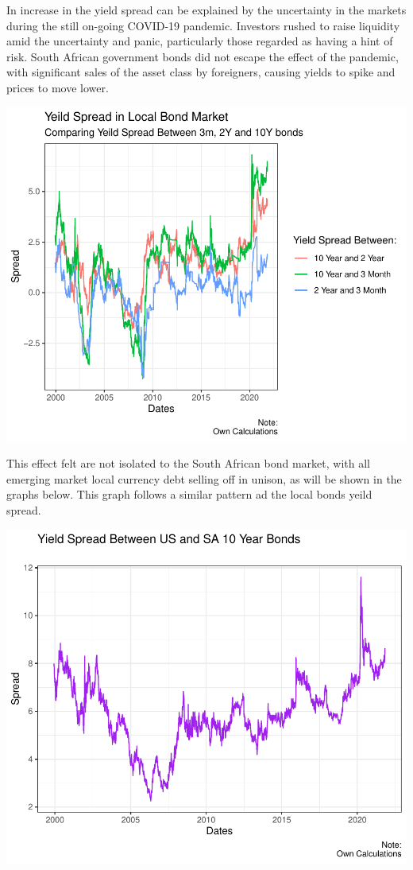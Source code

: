 \documentclass[11pt,preprint, authoryear]{elsarticle}
\numberwithin{equation}{section}
\numberwithin{figure}{section}
\numberwithin{table}{section}
\begin{document}
In increase in the yield spread can be explained by the uncertainty in
the markets during the still on-going COVID-19 pandemic. Investors
rushed to raise liquidity amid the uncertainty and panic, particularly
those regarded as having a hint of risk. South African government bonds
did not escape the effect of the pandemic, with significant sales of the
asset class by foreigners, causing yields to spike and prices to move
lower.

\includegraphics{Question1_files/figure-latex/unnamed-chunk-1-1.pdf}

This effect felt are not isolated to the South African bond market, with
all emerging market local currency debt selling off in unison, as will
be shown in the graphs below. This graph follows a similar pattern ad
the local bonds yeild spread.

\includegraphics{Question1_files/figure-latex/unnamed-chunk-2-1.pdf}
\end{document}
